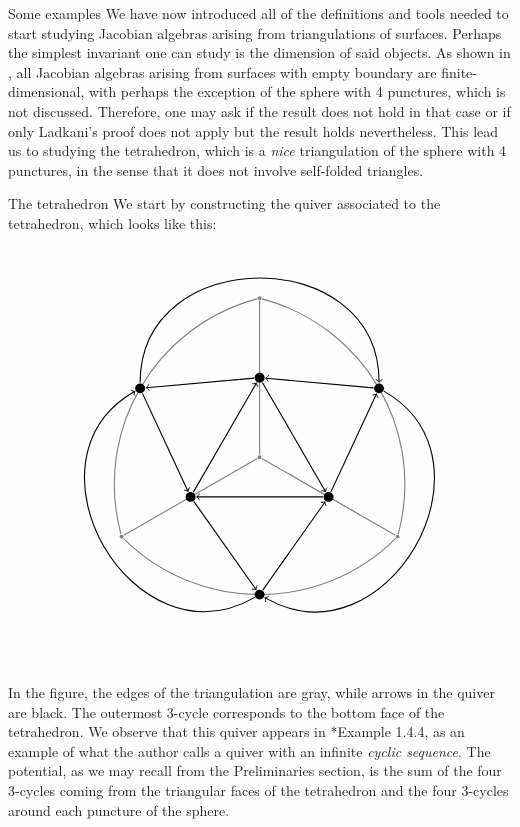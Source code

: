 \begin{chapter}{Some examples}
We have now introduced all of the definitions and tools needed to start studying Jacobian algebras arising from triangulations of surfaces. Perhaps the simplest invariant one can study is the dimension of said objects. As shown in \cite{Lad12}, all Jacobian algebras arising from surfaces with empty boundary are finite-dimensional, with perhaps the exception of the sphere with 4 punctures, which is not discussed. Therefore, one may ask if the result does not hold in that case or if only Ladkani's proof does not apply but the result holds nevertheless. This lead us to studying the tetrahedron, which is a \emph{nice} triangulation of the sphere with 4 punctures, in the sense that it does not involve self-folded triangles.

\begin{section}{The tetrahedron}
\label{tetra}
We start by constructing the quiver associated to the tetrahedron, which looks like this:
\[
\begin{tikzpicture}[thick]
\tikzstyle{every node} = [circle, fill=gray, minimum size=.1cm, inner sep=0cm]
\node (c) at (0,0) {};
\node (n) at (0,4) {};
\node (sw) at (210:4) {};
\node (se) at (330:4) {};
\draw[gray] (c) -- (sw)
	(c) -- (n)
	(c) -- (se)
	(sw) to [bend right = 45] coordinate[midway](m1) (se)
	(n) to [bend right = 45] coordinate[midway](m2) (sw)
	(se) to [bend right = 45] coordinate[midway](m3) (n);
\tikzstyle{every node} = [circle, fill=black, minimum size=.25cm, inner sep=0cm]
\node (in) at (0,2) {};
\node (isw) at (210:2) {};
\node (ise) at (330:2) {};
\node (os) at (m1) {};
\node (onw) at (m2) {};
\node (one) at (m3) {};
\draw[->] (in) -- (onw);
\draw[->] (onw) -- (isw);
\draw[->] (isw) -- (in);
\draw[->] (in) -- (ise);
\draw[->] (ise) -- (isw);
\draw[->] (ise) -- (one);
\draw[->] (one) -- (in);
\draw[->] (isw) -- (os);
\draw[->] (os) -- (ise);
\draw[->] (one) to [bend left=90, distance=100] (os);
\draw[->] (onw) to [bend left=90, distance=100] (one);
\draw[->] (os) to [bend left=90, distance=100] (onw);
\end{tikzpicture}
\]
In the figure, the edges of the triangulation are gray, while arrows in the quiver are black. The outermost 3-cycle corresponds to the bottom face of the tetrahedron. We observe that this quiver appears in {\cite{VD14}*{Example 1.4.4}}, as an example of what the author calls a quiver with an infinite \emph{cyclic sequence}. The potential, as we may recall from the Preliminaries section, is the sum of the four 3-cycles coming from the triangular faces of the tetrahedron and the four 3-cycles around each puncture of the sphere.


\end{section}
\end{chapter}
